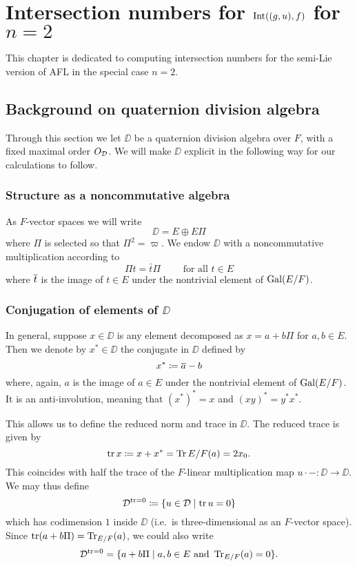\chapter{Intersection numbers for $\operatorname{Int}((g,u), f)$ for $n = 2$}
This chapter is dedicated to computing intersection numbers
for the semi-Lie version of AFL in the special case $n = 2$.

\section{Background on quaternion division algebra}
Through this section we let $\DD$ be a quaternion division algebra over $F$,
with a fixed maximal order $O_\mathcal D$.
We will make $\DD$ explicit in the following way for our calculations to follow.

\subsection{Structure as a noncommutative algebra}
As $F$-vector spaces we will write
\[ \DD = E \oplus E \Pi \]
where $\Pi$ is selected so that $\Pi^2 = \varpi$.
We endow $\DD$ with a noncommutative multiplication according to
\[ \Pi t = \bar t \Pi \qquad \text{ for all } t \in E \]
where $\overline{t}$ is the image of $t \in E$ under the nontrivial element of $\operatorname{Gal}(E/F)$.

\subsection{Conjugation of elements of $\DD$}
In general, suppose $x \in \DD$ is any element
decomposed as $x = a + b \Pi$ for $a,b \in E$.
Then we denote by $x^\ast \in \DD$ the conjugate in $\DD$ defined by
\[ x^\ast \coloneqq \overline{a} - b \]
where, again, $a$ is the image of $a \in E$ under the nontrivial element of $\operatorname{Gal}(E/F)$.
It is an anti-involution, meaning that $(x^\ast)^\ast = x$ and $(xy)^\ast = y^\ast x^\ast$.

This allows us to define the reduced norm and trace in $\DD$.
The reduced trace is given by
\[ \operatorname{tr} x \coloneqq x + x^\ast = \operatorname{Tr}{E/F}(a) = 2x_0. \]
This coincides with half the trace of the
$F$-linear multiplication map $u \cdot - \colon \DD \to \DD$.
We may thus define
\[ \mathcal D^{\operatorname{tr} = 0} \coloneqq \left\{ u \in \mathcal D \mid \operatorname{tr} u = 0 \right\} \]
which has codimension $1$ inside $\DD$ (i.e.\ is three-dimensional as an $F$-vector space).
Since $\operatorname{tr}(a+b\Pi) = \operatorname{Tr}_{E/F}(a)$, we could also write
\[ \mathcal D^{\operatorname{tr} = 0} = \{ a+b\Pi \mid a,b \in E \text{ and } \operatorname{Tr}_{E/F}(a) = 0 \}. \]

